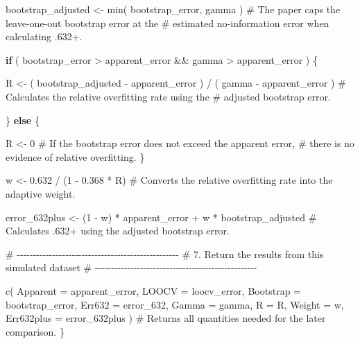 \documentclass[
  letterpaper,
  DIV=11,
  numbers=noendperiod]{scrreprt}
\newenvironment{Shaded}{\begin{snugshade}}{\end{snugshade}}
\newcommand{\AttributeTok}[1]{\textcolor[rgb]{0.40,0.45,0.13}{#1}}
\newcommand{\CommentTok}[1]{\textcolor[rgb]{0.37,0.37,0.37}{#1}}
\newcommand{\ControlFlowTok}[1]{\textcolor[rgb]{0.00,0.23,0.31}{\textbf{#1}}}
\newcommand{\DecValTok}[1]{\textcolor[rgb]{0.68,0.00,0.00}{#1}}
\newcommand{\FloatTok}[1]{\textcolor[rgb]{0.68,0.00,0.00}{#1}}
\newcommand{\FunctionTok}[1]{\textcolor[rgb]{0.28,0.35,0.67}{#1}}
\newcommand{\NormalTok}[1]{\textcolor[rgb]{0.00,0.23,0.31}{#1}}
\newcommand{\OtherTok}[1]{\textcolor[rgb]{0.00,0.23,0.31}{#1}}
\newcommand{\SpecialCharTok}[1]{\textcolor[rgb]{0.37,0.37,0.37}{#1}}
\begin{document}
\begin{Shaded}
\begin{Highlighting}[]
\NormalTok{  bootstrap\_adjusted }\OtherTok{\textless{}{-}} \FunctionTok{min}\NormalTok{(}
\NormalTok{    bootstrap\_error,}
\NormalTok{    gamma}
\NormalTok{  )}
  \CommentTok{\# The paper caps the leave{-}one{-}out bootstrap error at the}
  \CommentTok{\# estimated no{-}information error when calculating .632+.}
  
  \ControlFlowTok{if}\NormalTok{ (}
\NormalTok{    bootstrap\_error }\SpecialCharTok{\textgreater{}}\NormalTok{ apparent\_error }\SpecialCharTok{\&\&}
\NormalTok{    gamma }\SpecialCharTok{\textgreater{}}\NormalTok{ apparent\_error}
\NormalTok{  ) \{}
  
\NormalTok{    R }\OtherTok{\textless{}{-}}\NormalTok{ (}
\NormalTok{      bootstrap\_adjusted }\SpecialCharTok{{-}}\NormalTok{ apparent\_error}
\NormalTok{    ) }\SpecialCharTok{/}\NormalTok{ (}
\NormalTok{      gamma }\SpecialCharTok{{-}}\NormalTok{ apparent\_error}
\NormalTok{    )}
    \CommentTok{\# Calculates the relative overfitting rate using the}
    \CommentTok{\# adjusted bootstrap error.}
  
\NormalTok{  \} }\ControlFlowTok{else}\NormalTok{ \{}
  
\NormalTok{    R }\OtherTok{\textless{}{-}} \DecValTok{0}
    \CommentTok{\# If the bootstrap error does not exceed the apparent error,}
    \CommentTok{\# there is no evidence of relative overfitting.}
\NormalTok{  \}}
  
\NormalTok{  w }\OtherTok{\textless{}{-}}
    \FloatTok{0.632} \SpecialCharTok{/}
\NormalTok{    (}\DecValTok{1} \SpecialCharTok{{-}} \FloatTok{0.368} \SpecialCharTok{*}\NormalTok{ R)}
  \CommentTok{\# Converts the relative overfitting rate into the adaptive weight.}
  
\NormalTok{  error\_632plus }\OtherTok{\textless{}{-}}
\NormalTok{    (}\DecValTok{1} \SpecialCharTok{{-}}\NormalTok{ w) }\SpecialCharTok{*}\NormalTok{ apparent\_error }\SpecialCharTok{+}
\NormalTok{    w }\SpecialCharTok{*}\NormalTok{ bootstrap\_adjusted}
  \CommentTok{\# Calculates .632+ using the adjusted bootstrap error.}


  \CommentTok{\# {-}{-}{-}{-}{-}{-}{-}{-}{-}{-}{-}{-}{-}{-}{-}{-}{-}{-}{-}{-}{-}{-}{-}{-}{-}{-}{-}{-}{-}{-}{-}{-}{-}{-}{-}{-}{-}{-}{-}{-}{-}{-}{-}{-}{-}{-}{-}{-}{-}{-}}
  \CommentTok{\# 7. Return the results from this simulated dataset}
  \CommentTok{\# {-}{-}{-}{-}{-}{-}{-}{-}{-}{-}{-}{-}{-}{-}{-}{-}{-}{-}{-}{-}{-}{-}{-}{-}{-}{-}{-}{-}{-}{-}{-}{-}{-}{-}{-}{-}{-}{-}{-}{-}{-}{-}{-}{-}{-}{-}{-}{-}{-}{-}}

  \FunctionTok{c}\NormalTok{(}
    \AttributeTok{Apparent =}\NormalTok{ apparent\_error,}
    \AttributeTok{LOOCV =}\NormalTok{ loocv\_error,}
    \AttributeTok{Bootstrap =}\NormalTok{ bootstrap\_error,}
    \AttributeTok{Err632 =}\NormalTok{ error\_632,}
    \AttributeTok{Gamma =}\NormalTok{ gamma,}
    \AttributeTok{R =}\NormalTok{ R,}
    \AttributeTok{Weight =}\NormalTok{ w,}
    \AttributeTok{Err632plus =}\NormalTok{ error\_632plus}
\NormalTok{  )}
  \CommentTok{\# Returns all quantities needed for the later comparison.}
\NormalTok{\}}
\end{Highlighting}
\end{Shaded}
\end{document}

